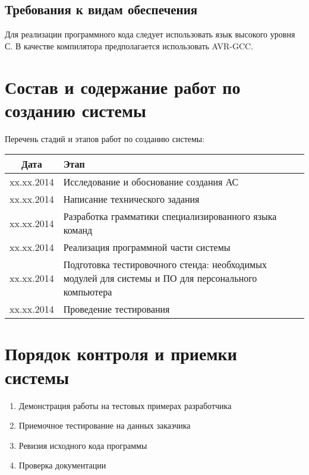 \documentclass[a4paper, 12pt]{report}
\begin{document}

\subsection{Требования к видам обеспечения}

Для реализации программного кода следует использовать язык высокого уровня С. В качестве компилятора предполагается использовать AVR-GCC.


\section{Состав и содержание работ по созданию системы}

Перечень стадий и этапов работ по созданию системы:\\
\begin{tabular}{|c|p{5in}|}
	\hline
	Дата & Этап \\
	\hline
	xx.xx.2014 & Исследование и обоснование создания АС \\
	\hline
	xx.xx.2014 & Написание технического задания \\
	\hline
	xx.xx.2014 & Разработка грамматики специализированного языка команд \\
	\hline
	xx.xx.2014 & Реализация программной части системы \\
	\hline
	xx.xx.2014 & Подготовка тестировочного стенда: необходимых модулей для системы и ПО для персонального компьютера \\
	\hline
	xx.xx.2014 & Проведение тестирования \\
	\hline

\end{tabular}

\section{Порядок контроля и приемки системы}
\begin{enumerate}
	\item Демонстрация работы на тестовых примерах разработчика
	\item Приемочное тестирование на данных заказчика
	\item Ревизия исходного кода программы
	\item Проверка документации
\end{enumerate}
\end{document}

